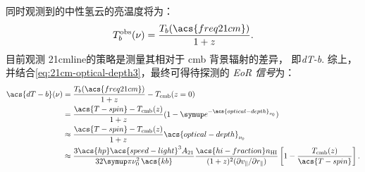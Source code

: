 同时观测到的中性氢云的亮温度将为：
\begin{equation}
  T_b^{\R{obs}}(\nu) = \frac{T_b(\acs{freq21cm})}{1 + z} .
\end{equation}
目前观测 \ac{21cmline}的策略是测量其相对于 \ac{cmb} 背景辐射的差异，
即\emph{\acf{dT-b}}.
综上，并结合\autoref{eq:21cm-optical-depth3}，最终可得待探测的 \emph{EoR 信号}为：
\begin{align}
  \acs{dT-b}(\nu)
    & = \frac{T_b(\acs{freq21cm})}{1 + z} - T_{\R{cmb}}(z=0)  \\
    & = \frac{\acs{T-spin} - T_{\R{cmb}}(z)}{1+z}
      (1 - \Ce^{-\acs{optical-depth}_{\nu_0}})  \\
    & \approx \frac{\acs{T-spin} - T_{\R{cmb}}(z)}{1+z}
      \acs{optical-depth}_{\nu_0}  \\
    & \approx \frac{3 \acs{hp} \acs{speed-light}^3 A_{21}}{
      32\Cpi \nu_0^2 \,\acs{kb}}
      \frac{\acs{hi-fraction} n_{\R{HI}}}{
        (1+z)^2 (\partial v_{\parallel} / \partial r_{\parallel})}
      \left[ 1 - \frac{T_{\R{cmb}}(z)}{\acs{T-spin}} \right] .
    \label{eq:eor-signal1}
\end{align}

